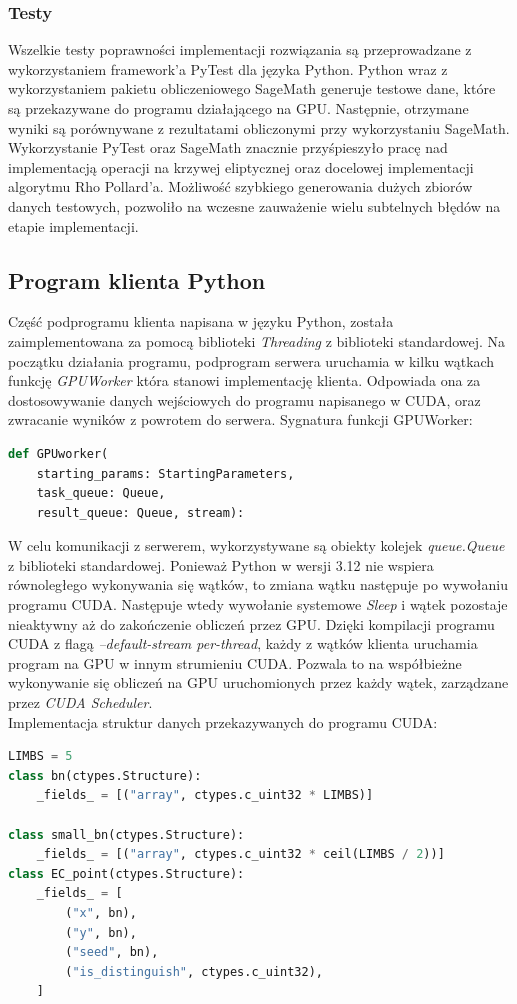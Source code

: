 \subsubsection{Testy}
Wszelkie testy poprawności implementacji rozwiązania są przeprowadzane z wykorzystaniem framework'a PyTest dla języka Python.
Python wraz z wykorzystaniem pakietu obliczeniowego SageMath generuje testowe dane, które
są przekazywane do programu działającego na GPU. Następnie, otrzymane wyniki są porównywane z rezultatami
obliczonymi przy wykorzystaniu SageMath. Wykorzystanie PyTest oraz SageMath znacznie przyśpieszyło pracę
nad implementacją operacji na krzywej eliptycznej oraz docelowej implementacji algorytmu Rho Pollard'a.
Możliwość szybkiego generowania dużych zbiorów danych testowych, pozwoliło na wczesne zauważenie wielu subtelnych błędów
na etapie implementacji.


\subsection{Program klienta Python}
Część podprogramu klienta napisana w języku Python, została zaimplementowana
za pomocą biblioteki \textit{Threading} z biblioteki standardowej.
Na początku działania programu, podprogram serwera uruchamia w kilku wątkach
funkcję \textit{GPUWorker} która stanowi implementację klienta.
Odpowiada ona za
dostosowywanie danych wejściowych do programu napisanego w CUDA, oraz
zwracanie wyników z powrotem do serwera. Sygnatura funkcji GPUWorker:
\begin{lstlisting}[language=Python]
def GPUworker(
    starting_params: StartingParameters,
    task_queue: Queue,
    result_queue: Queue, stream):
\end{lstlisting}

W celu komunikacji z serwerem, wykorzystywane są obiekty kolejek
\textit{queue.Queue} z biblioteki standardowej.
Ponieważ Python w wersji 3.12 nie wspiera równoległego wykonywania
się wątków, to zmiana wątku następuje po wywołaniu programu CUDA.
Następuje wtedy wywołanie systemowe \textit{Sleep} i wątek pozostaje nieaktywny
aż do zakończenie obliczeń przez GPU.
Dzięki kompilacji programu CUDA z flagą \textit{--default-stream per-thread},
każdy z wątków klienta uruchamia program na GPU w innym strumieniu CUDA. Pozwala
to na współbieżne wykonywanie się obliczeń na GPU uruchomionych przez każdy wątek, zarządzane przez
\textit{CUDA Scheduler}. \\
Implementacja struktur danych przekazywanych do programu CUDA:
\begin{lstlisting}[language=Python]
LIMBS = 5
class bn(ctypes.Structure):
    _fields_ = [("array", ctypes.c_uint32 * LIMBS)]

class small_bn(ctypes.Structure):
    _fields_ = [("array", ctypes.c_uint32 * ceil(LIMBS / 2))]
class EC_point(ctypes.Structure):
    _fields_ = [
        ("x", bn),
        ("y", bn),
        ("seed", bn),
        ("is_distinguish", ctypes.c_uint32),
    ]
\end{lstlisting}

